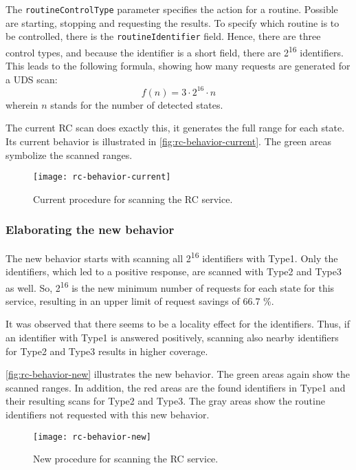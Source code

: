 The \texttt{routineControlType} parameter specifies the action for a routine. Possible are starting, stopping and requesting the results. To specify which routine is to be controlled, there is the \texttt{routineIdentifier} field. Hence, there are three control types, and because the identifier is a short field, there are 2\textsuperscript{16} identifiers. This leads to the following formula, showing how many requests are generated for a UDS scan:
\[f(n)=3 \cdot 2^{16} \cdot n\]
wherein $n$ stands for the number of detected states.

The current RC scan does exactly this, it generates the full range for each state. Its current behavior is illustrated in \autoref{fig:rc-behavior-current}. The green areas symbolize the scanned ranges.

\begin{figure}[h]
    \centering
    \texttt{[image: rc-behavior-current]}
    \caption{Current procedure for scanning the RC service.}
    \label{fig:rc-behavior-current}
\end{figure}

\subsubsection{Elaborating the new behavior}

The new behavior starts with scanning all 2\textsuperscript{16} identifiers with Type1. Only the identifiers, which led to a positive response, are scanned with Type2 and Type3 as well. So, 2\textsuperscript{16} is the new minimum number of requests for each state for this service, resulting in an upper limit of request savings of 66.7 \%.

It was observed that there seems to be a locality effect for the identifiers. Thus, if an identifier with Type1 is answered positively, scanning also nearby identifiers for Type2 and Type3 results in higher coverage.

\autoref{fig:rc-behavior-new} illustrates the new behavior. The green areas again show the scanned ranges. In addition, the red areas are the found identifiers in Type1 and their resulting scans for Type2 and Type3. The gray areas show the routine identifiers not requested with this new behavior.

\begin{figure}[h]
    \centering
    \texttt{[image: rc-behavior-new]}
    \caption{New procedure for scanning the RC service.}
    \label{fig:rc-behavior-new}
\end{figure}

